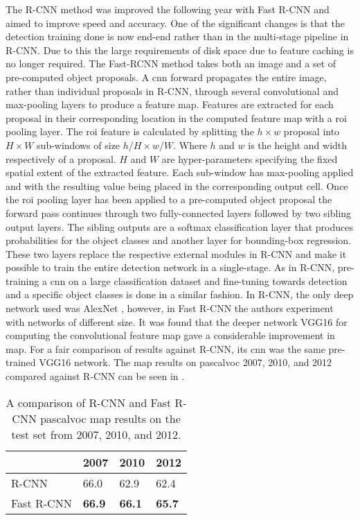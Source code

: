 The R-CNN method was improved the following year with Fast R-CNN \cite{fastrcnn} and aimed to improve speed and accuracy. One of the significant changes is that the detection training done is now end-end rather than in the multi-stage pipeline in R-CNN. Due to this the large requirements of disk space due to feature caching is no longer required. The Fast-RCNN method takes both an image and a set of pre-computed object proposals. A \gls{cnn} forward propagates the entire image, rather than individual proposals in R-CNN, through several convolutional and max-pooling layers to produce a feature map. Features are extracted for each proposal in their corresponding location in the computed feature map with a \gls{roi} pooling layer. The \gls{roi} feature is calculated by splitting the $h \times w$ proposal into $H \times W$ sub-windows of size $h/H \times w/W$. Where $h$ and $w$ is the height and width respectively of a proposal. $H$ and $W$ are hyper-parameters specifying the fixed spatial extent of the extracted feature. Each sub-window has max-pooling applied and with the resulting value being placed in the corresponding output cell. Once the \gls{roi} pooling layer has been applied to a pre-computed object proposal the forward pass continues through two fully-connected layers followed by two sibling output layers. The sibling outputs are a softmax classification layer that produces probabilities for the object classes and another layer for bounding-box regression. These two layers replace the respective external modules in R-CNN and make it possible to train the entire detection network in a single-stage. As in R-CNN, pre-training a \gls{cnn} on a large classification dataset and fine-tuning towards detection and a specific object classes is done in a similar fashion. In R-CNN, the only deep network used was AlexNet \cite{alexnet}, however, in Fast R-CNN the authors experiment with networks of different size. It was found that the deeper network VGG16 \cite{vgg16} for computing the convolutional feature map gave a considerable improvement in \gls{map}. For a fair comparison of results against R-CNN, its \gls{cnn} was the same pre-trained VGG16 network. The \gls{map} results on \gls{pascalvoc} 2007, 2010, and 2012 compared against R-CNN can be seen in . 

\begin{table}[]
\centering
\caption{A comparison of R-CNN and Fast R-CNN \gls{pascalvoc} \gls{map} results on the test set from 2007, 2010, and 2012.}
\label{tab:fastresults}
\begin{tabular}{|l|l|l|l|}
 \hline
           & 2007 & 2010 & 2012 \\ \hline
R-CNN      & 66.0 & 62.9 & 62.4 \\ 
Fast R-CNN & \textbf{66.9} & \textbf{66.1} & \textbf{65.7} \\ \hline
\end{tabular}
\end{table}

